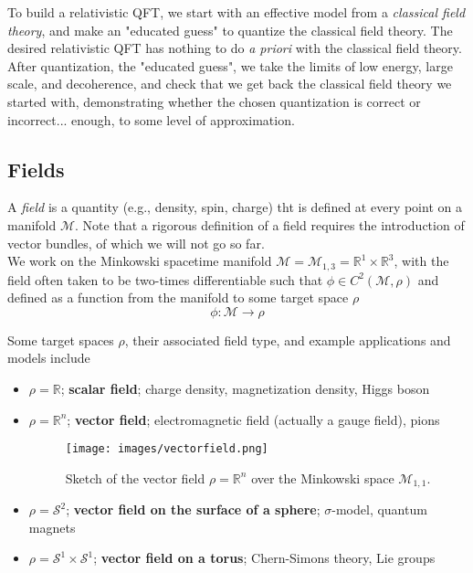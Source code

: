 \noindent To build a relativistic QFT, we start with an effective model from a \textit{classical field theory}, and make an "educated guess" to quantize the classical field theory. The desired relativistic QFT has nothing to do \textit{a priori} with the classical field theory. After quantization, the "educated guess", we take the limits of low energy, large scale, and decoherence, and check that we get back the classical field theory we started with, demonstrating whether the chosen quantization is correct or incorrect... enough, to some level of approximation.

\subsection*{Fields}

\noindent A \textit{field} is a quantity (e.g., density, spin, charge) tht is defined at every point on a manifold $\mathcal{M}$. Note that a rigorous definition of a field requires the introduction of vector bundles, of which we will not go so far. \\
We work on the Minkowski spacetime manifold $\mathcal{M} = \mathcal{M}_{1,3} = \mathbb{R}^1 \times \mathbb{R}^3$, with the field often taken to be two-times differentiable such that $\phi \in C^2(\mathcal{M}, \rho)$ and defined as a function from the manifold to some target space $\rho$
\begin{equation}
\phi : \mathcal{M} \rightarrow \rho 
\end{equation}

\noindent Some target spaces $\rho$, their associated field type, and example applications and models include

\begin{itemize}
\item $\rho = \mathbb{R}$; \textbf{scalar field}; charge density, magnetization density, Higgs boson
\item $\rho = \mathbb{R}^n$; \textbf{vector field}; electromagnetic field (actually a gauge field), pions
	\begin{figure}[H]
		\centering
		\texttt{[image: images/vectorfield.png]}
		\caption{Sketch of the vector field $\rho = \mathbb{R}^n$ over the Minkowski space $\mathcal{M}_{1,1}$.}
		\label{fig:fig1}
	\end{figure}
\item $\rho = \mathcal{S}^2$;  \textbf{vector field on the surface of a sphere};  $\sigma$-model, quantum magnets
\item $\rho = \mathcal{S}^1 \times \mathcal{S}^1$; \textbf{vector field on a torus}; Chern-Simons theory, Lie groups
\end{itemize}

